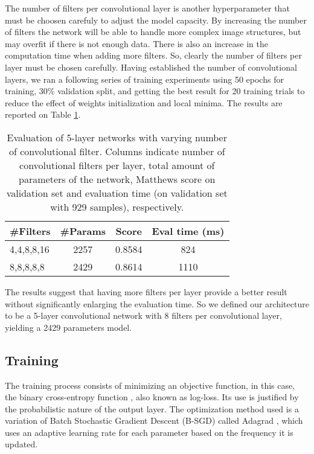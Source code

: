         The number of filters per convolutional layer is another hyperparameter that must be choosen carefuly to adjust the model capacity. By increasing the number of filters the network will be able to handle more complex image structures, but may overfit if there is not enough data. There is also an increase in the computation time when adding more filters. So, clearly the number of filters per layer must be chosen carefully. Having established the number of convolutional layers, we ran a following series of training experiments using 50 epochs for training, 30\% validation split, and getting the best result for 20 training trials to reduce the effect of weights initialization and local minima. The results are reported on Table \ref{table:evalNumberFilters}.

        \begin{table}
      	 \begin{center}
      	  \label{table:evalNumberFilters}
      	  \caption{Evaluation of 5-layer networks with varying number of convolutional filter. Columns indicate number of convolutional filters per layer, total amount of parameters of the network, Matthews score on validation set and evaluation time (on validation set with 929 samples), respectively.}
      	  \begin{tabular}{ | l | c | c | c |}
      	    \hline
      	    \#Filters  & \#Params  &  Score   & Eval time (ms)   \\ \hline
      	    4,4,8,8,16 &   2257    &  0.8584  &    824           \\
      	    8,8,8,8,8  &   2429    &  0.8614  &    1110           \\ \hline
      		  \end{tabular}
      		\end{center}
      	 \end{table}

        The results suggest that having more filters per layer provide a better result without significantly enlarging the evaluation time. So we defined our architecture to be a 5-layer convolutional network with 8 filters per convolutional layer, yielding a 2429 parameters model.


    \subsection{Training}
        The training process consists of minimizing an objective function, in this case, the binary cross-entropy function \cite{DLbook}, also known as log-loss. Its use is justified by the probabilistic nature of the output layer. The optimization method used is a variation of Batch Stochastic Gradient Descent (B-SGD) called Adagrad \cite{duchi2011adaptive}, which uses an adaptive learning rate for each parameter based on the frequency it is updated.

